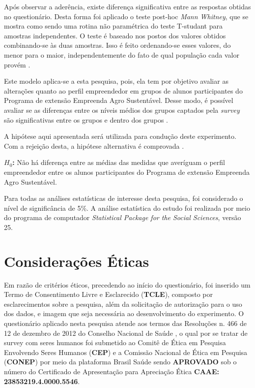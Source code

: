 Após observar a aderência, existe diferença significativa entre as respostas obtidas no questionário. Desta forma foi aplicado o teste post-hoc \textit{Mann Whitney}, que se mostra como sendo uma rotina não paramétrica do teste T-studant para amostras independentes. O teste é baseado nos postos dos valores obtidos combinando-se às duas amostras. Isso é feito ordenando-se esses valores, do menor para o maior, independentemente do fato de qual população cada valor provém \cite{matsouaka_optimal_2018}.

Este modelo aplica-se a esta pesquisa, pois, ela tem por objetivo avaliar as alterações quanto ao perfil empreendedor em grupos de alunos participantes do Programa de extensão Empreenda Agro Sustentável. Desse modo, é possível avaliar se as diferenças entre os níveis médios dos grupos captados pela \textit{survey} são significativas entre os grupos e dentro dos grupos \cite{rocha_avaliacao_2014}.

A hipótese aqui apresentada será utilizada para condução deste experimento. Com a rejeição desta, a hipótese alternativa é comprovada \cite{hair_alise_2009}.

\textbf{$H_0$:} Não há diferença entre as médias das medidas que averíguam o perfil empreendedor entre os alunos participantes do Programa de extensão Empreenda Agro Sustentável.

Para todas as análises estatísticas de interesse desta pesquisa, foi considerado o nível de significância de 5\%. A análise estatística do estudo foi realizada por meio do programa de computador \textit{Statistical Package for the Social Sciences}, \cite{ibm_corp_ibm_2017} versão 25. 

\section{Considerações Éticas}

Em razão de critérios éticos, precedendo ao início do questionário, foi inserido um Termo de Consentimento Livre e Esclarecido (\textbf{TCLE}), composto por esclarecimentos sobre a pesquisa, além da solicitação de autorização para o uso dos dados, e imagem que seja necessária ao desenvolvimento do experimento. O questionário aplicado nesta pesquisa atende aos termos das Resoluções n. 466 de 12 de dezembro de 2012 do Conselho Nacional de Saúde \cite{cns_resolucao_2012}, o qual por se tratar de survey com seres humanos foi submetido ao Comitê de Ética em Pesquisa Envolvendo Seres Humanos (\textbf{CEP}) e a Comissão Nacional de Ética em Pesquisa (\textbf{CONEP}) por meio da plataforma Brasil Saúde sendo \textbf{APROVADO} sob o número do Certificado de Apresentação para Apreciação Ética \textbf{CAAE: 23853219.4.0000.5546}.

